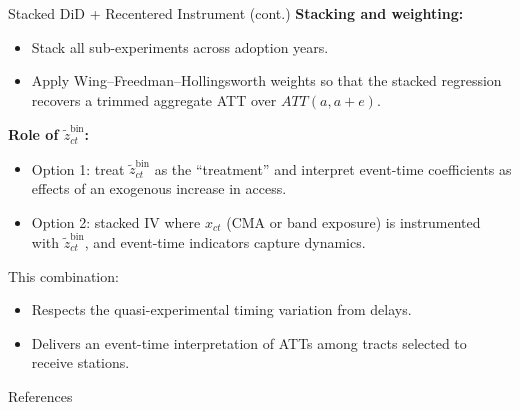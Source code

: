 \documentclass{beamer}
\begin{document}
\begin{frame}{Stacked DiD + Recentered Instrument (cont.)}
\small
\textbf{Stacking and weighting:}
\begin{itemize}
    \item Stack all sub-experiments across adoption years.
    \item Apply Wing–Freedman–Hollingsworth weights so that the stacked regression recovers a trimmed aggregate ATT over $ATT(a, a+e)$.
\end{itemize}

\medskip
\textbf{Role of $\tilde{z}^{\text{bin}}_{ct}$:}
\begin{itemize}
    \item Option 1: treat $\tilde{z}^{\text{bin}}_{ct}$ as the “treatment” and interpret event-time coefficients as effects of an exogenous increase in access.
    \item Option 2: stacked IV where $x_{ct}$ (CMA or band exposure) is instrumented with $\tilde{z}^{\text{bin}}_{ct}$, and event-time indicators capture dynamics.
\end{itemize}

\medskip
This combination:
\begin{itemize}
    \item Respects the quasi-experimental timing variation from delays.
    \item Delivers an event-time interpretation of ATTs among tracts selected to receive stations.
\end{itemize}
\end{frame}

\begin{frame}{References}
    \printbibliography[heading=none]
\end{frame}
\end{document}
